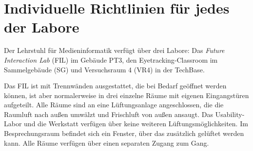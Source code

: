 \section{Individuelle Richtlinien für jedes der Labore}\label{sec:labore}

Der Lehrstuhl für Medieninformatik verfügt über drei Labore: Das \emph{Future Interaction Lab} (FIL) im Gebäude PT3, den Eyetracking-Classroom im Sammelgebäude (SG) und Versuchsraum 4 (VR4) in der TechBase.

\medskip
\begin{figure}[h]
    \sffamily
    \centering
\end{figure}

\noindent
Das FIL ist mit Trennwänden ausgestattet, die bei Bedarf geöffnet werden können, ist aber normalerweise in drei einzelne Räume mit eigenen Eingangstüren aufgeteilt.
Alle Räume sind an eine Lüftungsanlage angeschlossen, die die Raumluft nach außen umwälzt und Frischluft von außen ansaugt.
Das Usability-Labor und die Werkstatt verfügen über keine weiteren Lüftungsmöglichkeiten.
Im Besprechungsraum befindet sich ein Fenster, über das zusätzlich gelüftet werden kann.
Alle Räume verfügen über einen separaten Zugang zum Gang. 

